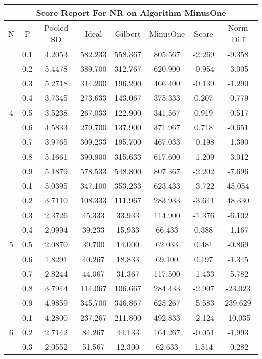 \documentclass[11pt,a4paper]{report}
\begin{document}
\begin{longtable}{ | c | c || c | c | c | c | c | c | }
\hline
\multicolumn{8}{|c|}{ Score Report For NR on Algorithm MinusOne} \\
\hline
N & P & Pooled SD &  Ideal &  Gilbert & MinusOne  & Score & Norm Diff \\
 \hline
 \hline
 \endhead
\multirow{9}{*}{4} & 0.1 & 4.2053 & 582.233 & 558.367 & 805.567 & -2.269 & -9.358 \\
 & 0.2 & 5.4478 & 389.700 & 312.767 & 620.900 & -0.954 & -3.005 \\
 & 0.3 & 5.2718 & 314.200 & 196.200 & 466.400 & -0.139 & -1.290 \\
 & 0.4 & 3.7345 & 273.633 & 143.067 & 375.333 & 0.207 & -0.779 \\
 & 0.5 & 3.5238 & 267.033 & 122.900 & 341.567 & 0.919 & -0.517 \\
 & 0.6 & 4.5833 & 279.700 & 137.900 & 371.967 & 0.718 & -0.651 \\
 & 0.7 & 3.9765 & 309.233 & 195.700 & 467.033 & -0.198 & -1.390 \\
 & 0.8 & 5.1661 & 390.900 & 315.633 & 617.600 & -1.209 & -3.012 \\
 & 0.9 & 5.1879 & 578.533 & 548.800 & 807.367 & -2.202 & -7.696 \\
 \hline
\multirow{9}{*}{5} & 0.1 & 5.0395 & 347.100 & 353.233 & 623.433 & -3.722 & 45.054 \\
 & 0.2 & 3.7110 & 108.333 & 111.967 & 283.933 & -3.641 & 48.330 \\
 & 0.3 & 2.3726 & 45.333 & 33.933 & 114.900 & -1.376 & -6.102 \\
 & 0.4 & 2.0994 & 39.233 & 15.933 & 66.433 & 0.388 & -1.167 \\
 & 0.5 & 2.0870 & 39.700 & 14.000 & 62.033 & 0.481 & -0.869 \\
 & 0.6 & 1.8291 & 40.267 & 18.833 & 69.100 & 0.197 & -1.345 \\
 & 0.7 & 2.8244 & 44.067 & 31.367 & 117.500 & -1.433 & -5.782 \\
 & 0.8 & 3.7944 & 114.067 & 106.667 & 284.433 & -2.907 & -23.023 \\
 & 0.9 & 4.9859 & 345.700 & 346.867 & 625.267 & -5.583 & 239.629 \\
 \hline
\multirow{9}{*}{6} & 0.1 & 4.2800 & 237.267 & 211.800 & 492.833 & -2.124 & -10.035 \\
 & 0.2 & 2.7142 & 84.267 & 44.133 & 164.267 & -0.051 & -1.993 \\
 & 0.3 & 2.0552 & 51.567 & 12.300 & 62.633 & 1.514 & -0.282 \\

\end{longtable}
\end{document}
